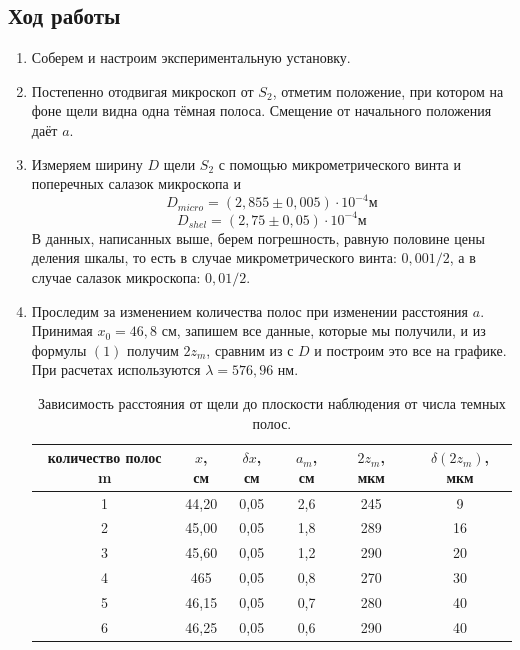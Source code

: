 \documentclass[a4paper, 12pt]{article}%
\begin{document}
\subsection*{Ход работы}
\begin{enumerate}
\item Соберем и настроим экспериментальную установку. 
\item Постепенно отодвигая микроскоп от $S_2$, отметим положение, при котором на фоне щели видна одна тёмная полоса. Смещение от начального положения даёт $a$.
\item Измеряем ширину $D$ щели $S_2$ с помощью микрометрического винта и поперечных салазок микроскопа и 
\[D_{micro} = (2,855 \pm 0,005) \cdot 10^{-4} \text{м}\]
\[D_{shel} = (2,75 \pm 0,05) \cdot 10^{-4} \text{м}\]
В данных, написанных выше, берем погрешность, равную половине цены деления шкалы, то есть в случае микрометрического винта: $0,001/2$, а в случае салазок микроскопа: $0,01/2$.
\item Проследим за изменением количества полос при изменении расстояния $a$. Принимая $x_0 = 46,8$ см, запишем все данные, которые мы получили, и из формулы $(1)$ получим $2z_m$, сравним из с $D$ и построим это все на графике. При расчетах используются $\lambda = 576,96$ нм.

\begin{table}[h]
\begin{center}
\begin{tabular}{|c|c|c|c|c|c|}
\hline
количество полос m & $x$, см & $\delta x$, см & $a_m$, см & $2z_m$, мкм & $\delta(2z_m)$, мкм \\ \hline
1                  & 44,20    & 0,05           & 2,6       & 245         & 9                   \\ \hline
2                  & 45,00      & 0,05            & 1,8       & 289         & 16                  \\ \hline
3                  & 45,60    & 0,05            & 1,2       & 290         & 20                  \\ \hline
4                  & 465      & 0,05            & 0,8       & 270         & 30                  \\ \hline
5                  & 46,15    & 0,05           & 0,7       & 280         & 40                  \\ \hline
6                  & 46,25    & 0,05            & 0,6       & 290         & 40                  \\ \hline
\end{tabular}
\caption{Зависимость расстояния от щели до плоскости наблюдения от числа темных полос.}
\end{center}
\end{table}


\end{enumerate}
\end{document}
